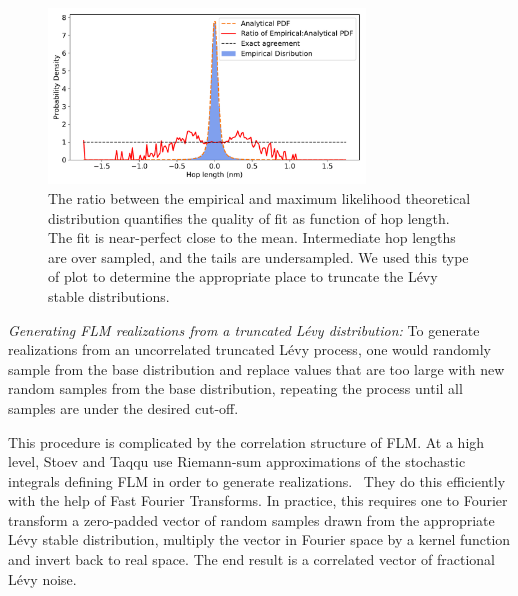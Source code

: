 \documentclass{article}
\begin{document}
  \begin{figure}
  \centering
  \includegraphics[width=0.75\textwidth]{truncation_cutoff.pdf}
  \caption{The ratio between the empirical and maximum likelihood theoretical
  distribution quantifies the quality of fit as function of hop length. The fit
  is near-perfect close to the mean. Intermediate hop lengths are over sampled, 
  and the tails are undersampled. We used this type of plot to determine the
  appropriate place to truncate the L\'evy stable distributions.}\label{fig:truncation_cutoff}
  \end{figure}
  
  \textit{Generating FLM realizations from a truncated L\'evy distribution:}
  To generate realizations from an uncorrelated truncated L\'evy process, one would
  randomly sample from the base distribution and replace values that are too large
  with new random samples from the base distribution, repeating the process until
  all samples are under the desired cut-off. 
  
  This procedure is complicated by the correlation structure of FLM. At a high level,
  Stoev and Taqqu use Riemann-sum approximations of the stochastic integrals defining
  FLM in order to generate realizations.~\cite{stoev_simulation_2004} They do this efficiently with the help of 
  Fast Fourier Transforms. In practice, this requires one to Fourier transform a zero-padded
  vector of random samples drawn from the appropriate L\'evy stable distribution, multiply
  the vector in Fourier space by a kernel function and invert back to real space. The end
  result is a correlated vector of fractional L\'evy noise.
  
\end{document}
